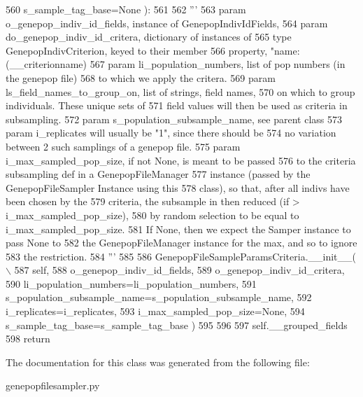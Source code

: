 \begin{DoxyCode}
560                 s\_sample\_tag\_base=\textcolor{keywordtype}{None} ):
561 
562         \textcolor{stringliteral}{'''}
563 \textcolor{stringliteral}{        param o\_genepop\_indiv\_id\_fields, instance of GenepopIndivIdFields,}
564 \textcolor{stringliteral}{        param do\_genepop\_indiv\_id\_critera, dictionary of instances of }
565 \textcolor{stringliteral}{                type GenepopIndivCriterion, keyed to their member}
566 \textcolor{stringliteral}{                property, "name: (\_\_criterionname)}
567 \textcolor{stringliteral}{        param li\_population\_numbers, list of pop numbers (in the genepop file)}
568 \textcolor{stringliteral}{                to which we apply the critera.}
569 \textcolor{stringliteral}{        param ls\_field\_names\_to\_group\_on, list of strings, field names, }
570 \textcolor{stringliteral}{                on which to group individuals.  These unique sets of}
571 \textcolor{stringliteral}{                field values will then be used as criteria in subsampling.}
572 \textcolor{stringliteral}{        param s\_population\_subsample\_name, see parent class}
573 \textcolor{stringliteral}{        param i\_replicates will usually be "1", since there should be}
574 \textcolor{stringliteral}{                no variation between 2 such samplings of a genepop file.}
575 \textcolor{stringliteral}{        param i\_max\_sampled\_pop\_size, if not None, is meant to be passed}
576 \textcolor{stringliteral}{            to the criteria subsampling def in a GenepopFileManager}
577 \textcolor{stringliteral}{            instance (passed by the GenepopFileSampler Instance using this}
578 \textcolor{stringliteral}{            class), so that, after all indivs have been chosen by the }
579 \textcolor{stringliteral}{            criteria, the subsample in then reduced (if > i\_max\_sampled\_pop\_size),}
580 \textcolor{stringliteral}{            by random selection to be equal to i\_max\_sampled\_pop\_size.}
581 \textcolor{stringliteral}{            If None, then we expect the Samper instance to pass None to }
582 \textcolor{stringliteral}{            the GenepopFileManager instance for the max, and so to ignore}
583 \textcolor{stringliteral}{            the restriction.}
584 \textcolor{stringliteral}{        '''}
585 
586         GenepopFileSampleParamsCriteria.\_\_init\_\_( \(\backslash\)
587                     self, 
588                     o\_genepop\_indiv\_id\_fields,
589                     o\_genepop\_indiv\_id\_critera,
590                     li\_population\_numbers=li\_population\_numbers, 
591                     s\_population\_subsample\_name=s\_population\_subsample\_name,
592                     i\_replicates=i\_replicates, 
593                     i\_max\_sampled\_pop\_size=\textcolor{keywordtype}{None},
594                     s\_sample\_tag\_base=s\_sample\_tag\_base )
595 
596         
597         self.\_\_grouped\_fields
598         \textcolor{keywordflow}{return}
\end{DoxyCode}


The documentation for this class was generated from the following file\+:\begin{DoxyCompactItemize}
\item 
genepopfilesampler.\+py\end{DoxyCompactItemize}
